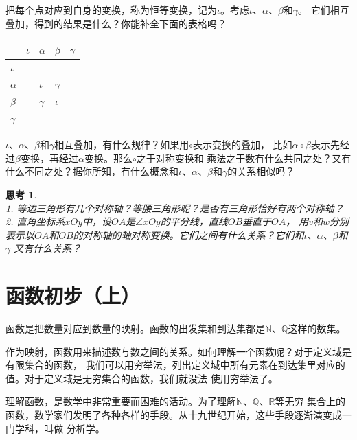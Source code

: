 \documentclass[12pt,UTF8]{ctexbook}
\newtheorem{sk}{思考}[section]
\begin{document}
把每个点对应到自身的变换，称为恒等变换，记为$\iota$。考虑$\iota$、$\alpha$、$\beta$和$\gamma$。
它们相互叠加，得到的结果是什么？你能补全下面的表格吗？
\begin{center}
    \begin{tabular}{  p{2em}<{\centering} | p{2em}<{\centering} | p{2em}<{\centering} | p{2em}<{\centering} | p{2em}<{\centering} | }
         & $\iota$ & $\alpha$ & $\beta$ & $\gamma$ \\ [0.5ex] 
        \hline
        $\iota$ &  &  &  &  \\  
        \hline
        $\alpha$ &  & $\iota$ & $\gamma$ &  \\  
        \hline
        $\beta$ &  & $\gamma$ & $\iota$ &  \\  
        \hline
        $\gamma$ &  &  &  &  \\ 
        \hline 
    \end{tabular}
\end{center}
$\iota$、$\alpha$、$\beta$和$\gamma$相互叠加，有什么规律？如果用$\circ$表示变换的叠加，
比如$\alpha \circ \beta$表示先经过$\beta$变换，再经过$\alpha$变换。那么$\circ$之于对称变换和
乘法之于数有什么共同之处？又有什么不同之处？据你所知，有什么概念和$\iota$、$\alpha$、$\beta$和$\gamma$的关系相似吗？

\begin{sk}\label{xt:4-2-0}
    \mbox{}\\
    1. 等边三角形有几个对称轴？等腰三角形呢？是否有三角形恰好有两个对称轴？\\
    2. 直角坐标系$xOy$中，设$OA$是$\angle xOy$的平分线，直线$OB$垂直于$OA$，
    用$v$和$w$分别表示以$OA$和$OB$的对称轴的轴对称变换。它们之间有什么关系？它们和$\iota$、$\alpha$、$\beta$和$\gamma$
    又有什么关系？
\end{sk}

\chapter{函数初步（上）}
函数是把数量对应到数量的映射。函数的出发集和到达集都是$\mathbb{N}$、$\mathbb{Q}$这样的数集。

作为映射，函数用来描述数与数之间的关系。如何理解一个函数呢？对于定义域是有限集合的函数，
我们可以用穷举法，列出定义域中所有元素在到达集里对应的值。对于定义域是无穷集合的函数，我们就没法
使用穷举法了。

理解函数，是数学中非常重要而困难的活动。为了理解$\mathbb{N}$、$\mathbb{Q}$、$\mathbb{R}$等无穷
集合上的函数，数学家们发明了各种各样的手段。从十九世纪开始，这些手段逐渐演变成一门学科，叫做
分析学。
\end{document}
